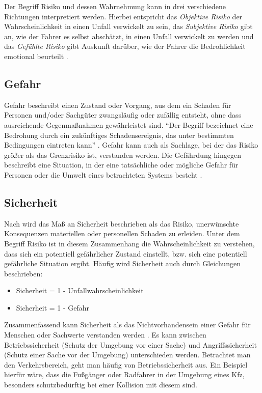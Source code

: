 Der Begriff Risiko und dessen Wahrnehmung kann in drei verschiedene Richtungen interpretiert werden. Hierbei entspricht das \textit{Objektive Risiko} der Wahrscheinlichkeit in einen Unfall verwickelt zu sein, das \textit{Subjektive Risiko} gibt an, wie der Fahrer es selbst abschätzt, in einen Unfall verwickelt zu werden und das \textit{Gefühlte Risiko} gibt Auskunft darüber, wie der Fahrer die Bedrohlichkeit emotional beurteilt \parencite[S. 461f]{Fuller.2005}.

\subsection{Gefahr}
Gefahr beschreibt einen Zustand oder Vorgang, aus dem ein Schaden für Personen und/oder Sachgüter zwangsläufig oder zufällig entsteht, ohne dass ausreichende Gegenmaßnahmen gewährleistet sind. \enquote{Der Begriff bezeichnet eine Bedrohung durch ein zukünftiges Schadensereignis, das unter bestimmten Bedingungen eintreten kann} \parencite[S. 8]{Hoffmann.26.04.2013}. Gefahr kann auch als Sachlage, bei der das Risiko größer als das Grenzrisiko ist, verstanden werden. Die Gefährdung hingegen beschreibt eine Situation, in der eine tatsächliche oder mögliche Gefahr für Personen oder die Umwelt eines betrachteten Systems besteht \parencite[S. 43f]{Hillenbrand.2012}.

\subsection{Sicherheit}
Nach \Textcite[S. 40]{Fricke.2006} wird das Maß an Sicherheit beschrieben als das Risiko, unerwünschte Konsequenzen materiellen oder personellen Schaden zu erleiden. Unter dem Begriff Risiko ist in diesem Zusammenhang die Wahrscheinlichkeit zu verstehen, dass sich ein potentiell gefährlicher Zustand einstellt, bzw. sich eine potentiell gefährliche Situation ergibt. Häufig wird Sicherheit auch durch Gleichungen beschrieben:

\begin{itemize}
	\item Sicherheit = 1 - Unfallwahrscheinlichkeit \parencite[S. 24]{Hoffmann.26.04.2013}
	\item Sicherheit = 1 - Gefahr \parencite[S. 42]{Hillenbrand.2012}
\end{itemize}

Zusammenfassend kann Sicherheit als das Nichtvorhandensein einer Gefahr für Menschen oder Sachwerte verstanden werden \parencite[S. 42]{Hillenbrand.2012}. Es kann zwischen Betriebssicherheit (Schutz der Umgebung vor einer Sache) und Angriffssicherheit (Schutz einer Sache vor der Umgebung) unterschieden werden. Betrachtet man den Verkehrsbereich, geht man häufig von Betriebssicherheit aus. Ein Beispiel hierfür wäre, dass die Fußgänger oder Radfahrer in der Umgebung eines Kfz, besonders schutzbedürftig bei einer Kollision mit diesem sind. 

